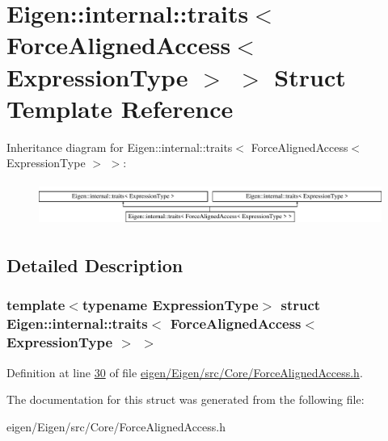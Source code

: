\hypertarget{struct_eigen_1_1internal_1_1traits_3_01_force_aligned_access_3_01_expression_type_01_4_01_4}{}\section{Eigen\+:\+:internal\+:\+:traits$<$ Force\+Aligned\+Access$<$ Expression\+Type $>$ $>$ Struct Template Reference}
\label{struct_eigen_1_1internal_1_1traits_3_01_force_aligned_access_3_01_expression_type_01_4_01_4}
Inheritance diagram for Eigen\+:\+:internal\+:\+:traits$<$ Force\+Aligned\+Access$<$ Expression\+Type $>$ $>$\+:\begin{figure}[H]
\begin{center}
\leavevmode
\includegraphics[height=1.435897cm]{struct_eigen_1_1internal_1_1traits_3_01_force_aligned_access_3_01_expression_type_01_4_01_4}
\end{center}
\end{figure}


\subsection{Detailed Description}
\subsubsection*{template$<$typename Expression\+Type$>$\newline
struct Eigen\+::internal\+::traits$<$ Force\+Aligned\+Access$<$ Expression\+Type $>$ $>$}



Definition at line \hyperlink{eigen_2_eigen_2src_2_core_2_force_aligned_access_8h_source_l00030}{30} of file \hyperlink{eigen_2_eigen_2src_2_core_2_force_aligned_access_8h_source}{eigen/\+Eigen/src/\+Core/\+Force\+Aligned\+Access.\+h}.



The documentation for this struct was generated from the following file\+:\begin{DoxyCompactItemize}
\item 
eigen/\+Eigen/src/\+Core/\+Force\+Aligned\+Access.\+h\end{DoxyCompactItemize}
